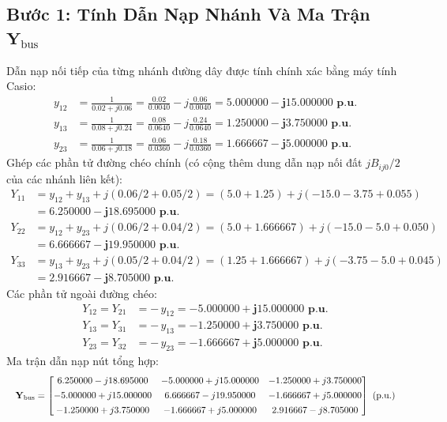 \documentclass[12pt,a4paper,oneside]{report}
\begin{document}
\subsection{Bước 1: Tính Dẫn Nạp Nhánh Và Ma Trận $\mathbf{Y}_{\text{bus}}$}
Dẫn nạp nối tiếp của từng nhánh đường dây được tính chính xác bằng máy tính Casio:
\begin{align}
y_{12} &= \frac{1}{0.02 + j0.06} = \frac{0.02}{0.0040} - j\frac{0.06}{0.0040} = \mathbf{5.000000 - j15.000000\text{ p.u.}} \\
y_{13} &= \frac{1}{0.08 + j0.24} = \frac{0.08}{0.0640} - j\frac{0.24}{0.0640} = \mathbf{1.250000 - j3.750000\text{ p.u.}} \\
y_{23} &= \frac{1}{0.06 + j0.18} = \frac{0.06}{0.0360} - j\frac{0.18}{0.0360} = \mathbf{1.666667 - j5.000000\text{ p.u.}}
\end{align}
Ghép các phần tử đường chéo chính (có cộng thêm dung dẫn nạp nối đất $j B_{ij0}/2$ của các nhánh liên kết):
\begin{align}
Y_{11} &= y_{12} + y_{13} + j(0.06/2 + 0.05/2) = (5.0 + 1.25) + j(-15.0 - 3.75 + 0.055) \nonumber \\
&= \mathbf{6.250000 - j18.695000\text{ p.u.}} \\
Y_{22} &= y_{12} + y_{23} + j(0.06/2 + 0.04/2) = (5.0 + 1.666667) + j(-15.0 - 5.0 + 0.050) \nonumber \\
&= \mathbf{6.666667 - j19.950000\text{ p.u.}} \\
Y_{33} &= y_{13} + y_{23} + j(0.05/2 + 0.04/2) = (1.25 + 1.666667) + j(-3.75 - 5.0 + 0.045) \nonumber \\
&= \mathbf{2.916667 - j8.705000\text{ p.u.}}
\end{align}
Các phần tử ngoài đường chéo:
\begin{align}
Y_{12} = Y_{21} &= -\, y_{12} = \mathbf{-5.000000 + j15.000000\text{ p.u.}} \\
Y_{13} = Y_{31} &= -\, y_{13} = \mathbf{-1.250000 + j3.750000\text{ p.u.}} \\
Y_{23} = Y_{32} &= -\, y_{23} = \mathbf{-1.666667 + j5.000000\text{ p.u.}}
\end{align}
Ma trận dẫn nạp nút tổng hợp:
\begin{equation}
\resizebox{\linewidth}{!}{$
\mathbf{Y}_{\text{bus}} = 
\begin{bmatrix}
6.250000 - j18.695000 & -5.000000 + j15.000000 & -1.250000 + j3.750000 \\[4pt]
-5.000000 + j15.000000 & 6.666667 - j19.950000 & -1.666667 + j5.000000 \\[4pt]
-1.250000 + j3.750000 & -1.666667 + j5.000000 & 2.916667 - j8.705000
\end{bmatrix}\text{ (p.u.)}
$}
\end{equation}
\end{document}
